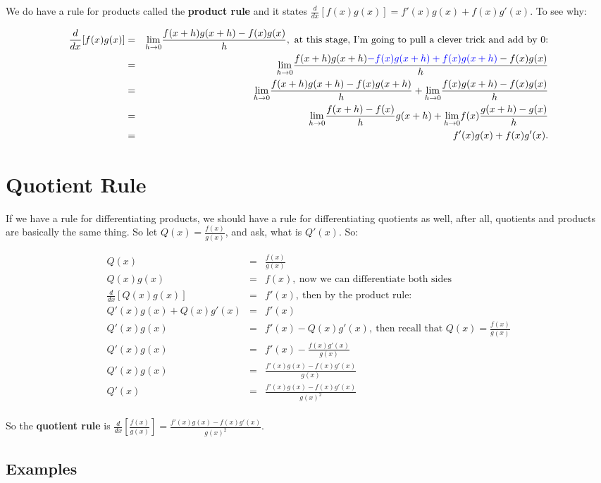 We do have a rule for products called the \textbf{ product rule} and it states $\frac{d}{dx}[f(x)g(x)]=f'(x)g(x)+f(x)g'(x).$  To see why:

\begin{eqnarray*}
\frac{d}{dx}[f(x)g(x)]&=&\limit{h}{0}\frac{f(x+h)g(x+h)-f(x)g(x)}{h},\ \text{at this stage, I'm going to pull a clever trick and add by 0:}\\
&=&\limit{h}{0}\frac{f(x+h)g(x+h)\textcolor{blue}{-f(x)g(x+h)+f(x)g(x+h)}-f(x)g(x)}{h}\\
&=&\limit{h}{0}\frac{f(x+h)g(x+h)-f(x)g(x+h)}{h}+\limit{h}{0}\frac{f(x)g(x+h)-f(x)g(x)}{h}\\
&=&\limit{h}{0}\frac{f(x+h)-f(x)}{h}g(x+h)+\limit{h}{0}f(x)\frac{g(x+h)-g(x)}{h}\\
&=&f'(x)g(x)+f(x)g'(x).
\end{eqnarray*}



\section{Quotient Rule}

If we have a rule for differentiating products, we should have a rule for differentiating quotients as well, after all, quotients and products are basically the same thing.  So let $Q(x)=\frac{f(x)}{g(x)}$, and ask, what is $Q'(x)$.  So:

\begin{eqnarray*}
Q(x)&=&\frac{f(x)}{g(x)}\\
Q(x)g(x)&=&f(x),\ \text{now we can differentiate both sides}\\
\frac{d}{dx}[Q(x)g(x)]&=&f'(x),\ \text{then by the product rule:}\\
Q'(x)g(x)+Q(x)g'(x)&=&f'(x)\\
Q'(x)g(x)&=&f'(x)-Q(x)g'(x),\ \text{then recall that  $Q(x)=\frac{f(x)}{g(x)}$}\\
Q'(x)g(x)&=&f'(x)-\frac{f(x)g'(x)}{g(x)}\\
Q'(x)g(x)&=&\frac{f'(x)g(x)-f(x)g'(x)}{g(x)}\\
Q'(x)&=&\frac{f'(x)g(x)-f(x)g'(x)}{g(x)^2}\\
\end{eqnarray*}


So the \textbf{ quotient rule} is $\frac{d}{dx}[\frac{f(x)}{g(x)}]=\frac{f'(x)g(x)-f(x)g'(x)}{g(x)^2}$.


\subsection{Examples}

